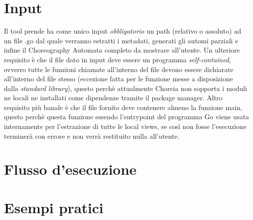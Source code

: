 \section{Input}
Il tool prende ha come unico input \emph{obbligatorio} un path (relativo o assoluto) ad un file .go dal quale verranno estratti i metadati, generati gli automi parziali e infine il Choreography Automata completo da mostrare all'utente. Un ulteriore requisito è che il file dato in input deve essere un programma \emph{self-contained}, ovverro tutte le funzioni chiamate all'interno del file devono essere dichiarate all'interno del file stesso (eccezione fatta per le funzione messe a disposizione dalla \emph{standard library}), questo perchè attualmente Choreia non sopporta i moduli ne locali ne installati come dipendenze tramite il package manager. Altro requisito più banale è che il file fornito deve contenere almeno la funzione main, questo perchè questa funzione essendo l'entrypoint del programma Go viene usata internamente per l'estrazione di tutte le local views, se così non fosse l'esecuzione terminerà con errore e non verrà restituito nulla all'utente.

\section{Flusso d'esecuzione}

\section{Esempi pratici}